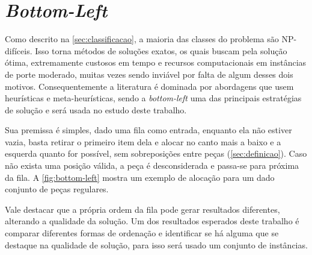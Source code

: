 \chapter{\textit{Bottom-Left}}\label{ch:bottom-left}

Como descrito na \autoref{sec:classificacao}, a maioria das classes do problema são NP-difíceis.
Isso torna métodos de soluções exatos, os quais buscam pela solução ótima, extremamente custosos em tempo e recursos computacionais em instâncias de porte moderado, muitas vezes sendo inviável por falta de algum desses dois motivos.
Consequentemente a literatura é dominada por abordagens que usem heurísticas e meta-heurísticas, sendo a \textit{bottom-left} uma das principais estratégias de solução e será usada no estudo deste trabalho.



Sua premissa é simples, dado uma fila como entrada, enquanto ela não estiver vazia, basta retirar o primeiro item dela e alocar no canto mais a baixo e a esquerda quanto for possível\cite{aprendizado-reforco}, sem sobreposições entre peças (\autoref{sec:definicao}).
Caso não exista uma posição válida, a peça é desconsiderada e passa-se para próxima da fila.
A \autoref{fig:bottom-left} mostra um exemplo de alocação para um dado conjunto de peças regulares.

Vale destacar que a própria ordem da fila pode gerar resultados diferentes, alterando a qualidade da solução.
Um dos resultados esperados deste trabalho é comparar diferentes formas de ordenação e identificar se há alguma que se destaque na qualidade de solução, para isso será usado um conjunto de instâncias.



